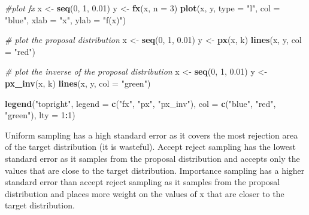 \documentclass[
]{article}
\newenvironment{Shaded}{\begin{snugshade}}{\end{snugshade}}
\newcommand{\AttributeTok}[1]{\textcolor[rgb]{0.13,0.29,0.53}{#1}}
\newcommand{\CommentTok}[1]{\textcolor[rgb]{0.56,0.35,0.01}{\textit{#1}}}
\newcommand{\DecValTok}[1]{\textcolor[rgb]{0.00,0.00,0.81}{#1}}
\newcommand{\FloatTok}[1]{\textcolor[rgb]{0.00,0.00,0.81}{#1}}
\newcommand{\FunctionTok}[1]{\textcolor[rgb]{0.13,0.29,0.53}{\textbf{#1}}}
\newcommand{\NormalTok}[1]{#1}
\newcommand{\OtherTok}[1]{\textcolor[rgb]{0.56,0.35,0.01}{#1}}
\newcommand{\SpecialCharTok}[1]{\textcolor[rgb]{0.81,0.36,0.00}{\textbf{#1}}}
\newcommand{\StringTok}[1]{\textcolor[rgb]{0.31,0.60,0.02}{#1}}
\begin{document}
\begin{Shaded}
\begin{Highlighting}[]
\CommentTok{\#plot fx }
\NormalTok{x }\OtherTok{\textless{}{-}} \FunctionTok{seq}\NormalTok{(}\DecValTok{0}\NormalTok{, }\DecValTok{1}\NormalTok{, }\FloatTok{0.01}\NormalTok{)}
\NormalTok{y }\OtherTok{\textless{}{-}} \FunctionTok{fx}\NormalTok{(x, }\AttributeTok{n =} \DecValTok{3}\NormalTok{)}
\FunctionTok{plot}\NormalTok{(x, y, }\AttributeTok{type =} \StringTok{"l"}\NormalTok{, }\AttributeTok{col =} \StringTok{"blue"}\NormalTok{, }\AttributeTok{xlab =} \StringTok{"x"}\NormalTok{, }\AttributeTok{ylab =} \StringTok{"f(x)"}\NormalTok{)}

\CommentTok{\# plot the proposal distribution}
\NormalTok{x }\OtherTok{\textless{}{-}} \FunctionTok{seq}\NormalTok{(}\DecValTok{0}\NormalTok{, }\DecValTok{1}\NormalTok{, }\FloatTok{0.01}\NormalTok{)}
\NormalTok{y }\OtherTok{\textless{}{-}} \FunctionTok{px}\NormalTok{(x, k)}
\FunctionTok{lines}\NormalTok{(x, y, }\AttributeTok{col =} \StringTok{"red"}\NormalTok{)}

\CommentTok{\# plot the inverse of the proposal distribution}
\NormalTok{x }\OtherTok{\textless{}{-}} \FunctionTok{seq}\NormalTok{(}\DecValTok{0}\NormalTok{, }\DecValTok{1}\NormalTok{, }\FloatTok{0.01}\NormalTok{)}
\NormalTok{y }\OtherTok{\textless{}{-}} \FunctionTok{px\_inv}\NormalTok{(x, k)}
\FunctionTok{lines}\NormalTok{(x, y, }\AttributeTok{col =} \StringTok{"green"}\NormalTok{)}

\FunctionTok{legend}\NormalTok{(}\StringTok{"topright"}\NormalTok{, }\AttributeTok{legend =} \FunctionTok{c}\NormalTok{(}\StringTok{"fx"}\NormalTok{, }\StringTok{"px"}\NormalTok{, }\StringTok{"px\_inv"}\NormalTok{), }\AttributeTok{col =} \FunctionTok{c}\NormalTok{(}\StringTok{"blue"}\NormalTok{, }\StringTok{"red"}\NormalTok{, }\StringTok{"green"}\NormalTok{), }\AttributeTok{lty =} \DecValTok{1}\SpecialCharTok{:}\DecValTok{1}\NormalTok{)}
\end{Highlighting}
\end{Shaded}

Uniform sampling has a high standard error as it covers the most
rejection area of the target distribution (it is wasteful). Accept
reject sampling has the lowest standard error as it samples from the
proposal distribution and accepts only the values that are close to the
target distribution. Importance sampling has a higher standard error
than accept reject sampling as it samples from the proposal distribution
and places more weight on the values of x that are closer to the target
distribution.
\end{document}
